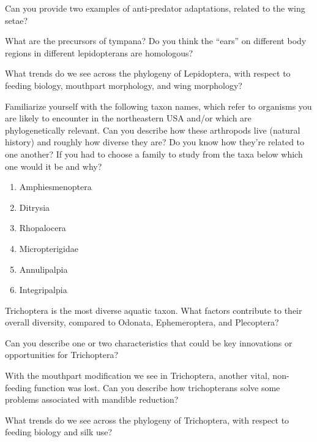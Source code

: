 \noindent{}Can you provide two examples of anti-predator adaptations, related to the wing setae?\vspace{3mm}

\noindent{}What are the precursors of tympana? Do you think the ``ears'' on different body regions in different lepidopterans are homologous?\vspace{3mm} 

\noindent{}What trends do we see across the phylogeny of Lepidoptera, with respect to feeding biology, mouthpart morphology, and wing morphology?\vspace{3mm}

\noindent{}Familiarize yourself with the following taxon names, which refer to organisms you are likely to encounter in the northeastern USA and/or which are phylogenetically relevant. Can you describe how these arthropods live (natural history) and roughly how diverse they are? Do you know how they're related to one another? If you had to choose a family to study from the taxa below which one would it be and why?

\begin{enumerate} 
\item Amphiesmenoptera
\item Ditrysia
\item Rhopalocera
\item Micropterigidae
\item Annulipalpia
\item Integripalpia
\end{enumerate}

\noindent{}Trichoptera is the most diverse aquatic taxon. What factors contribute to their overall diversity, compared to Odonata, Ephemeroptera, and Plecoptera?\vspace{3mm}

\noindent{}Can you describe one or two characteristics that could be key innovations or opportunities for Trichoptera?\vspace{3mm}

\noindent{}With the mouthpart modification we see in Trichoptera, another vital, non-feeding function was lost. Can you describe how trichopterans solve some problems associated with mandible reduction?\vspace{3mm}

\noindent{}What trends do we see across the phylogeny of Trichoptera, with respect to feeding biology and silk use? 

\clearpage
\thispagestyle{empty}